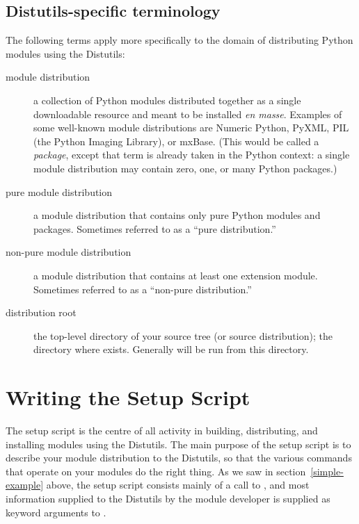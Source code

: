\documentclass{manual}
\begin{document}
\section{Distutils-specific terminology}
\label{distutils-term}

The following terms apply more specifically to the domain of
distributing Python modules using the Distutils:
\begin{description}
\item[module distribution] a collection of Python modules distributed
  together as a single downloadable resource and meant to be installed
  \emph{en masse}.  Examples of some well-known module distributions are
  Numeric Python, PyXML, PIL (the Python Imaging Library), or
  mxBase.  (This would be called a \emph{package}, except that term
  is already taken in the Python context: a single module distribution
  may contain zero, one, or many Python packages.)

\item[pure module distribution] a module distribution that contains only
  pure Python modules and packages.  Sometimes referred to as a ``pure
  distribution.''

\item[non-pure module distribution] a module distribution that contains
  at least one extension module.  Sometimes referred to as a ``non-pure
  distribution.''

\item[distribution root] the top-level directory of your source tree (or 
  source distribution); the directory where  exists.  Generally 
   will be run from this directory.
\end{description}


\chapter{Writing the Setup Script}
\label{setup-script}

The setup script is the centre of all activity in building,
distributing, and installing modules using the Distutils.  The main
purpose of the setup script is to describe your module distribution to
the Distutils, so that the various commands that operate on your modules
do the right thing.  As we saw in section~\ref{simple-example} above,
the setup script consists mainly of a call to , and
most information supplied to the Distutils by the module developer is
supplied as keyword arguments to .
\end{document}

